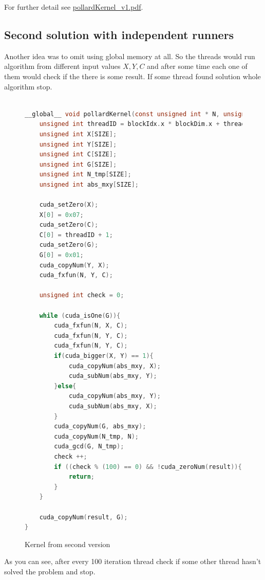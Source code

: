 \documentclass[a4paper]{article}
\begin{document}
For further detail see \url{pollardKernel_v1.pdf}.

\subsection{Second solution with independent runners}

Another idea was to omit using global memory at all. So the threads would run algorithm from different input values $X, Y, C$ and after some time each one of them would check if the there is some result. If some thread found solution whole algorithm stop.


\begin{figure}[H]
    \centering
    \begin{lstlisting}[language=c,basicstyle=\small]

__global__ void pollardKernel(const unsigned int * N, unsigned int * result){
    unsigned int threadID = blockIdx.x * blockDim.x + threadIdx.x;
    unsigned int X[SIZE];
    unsigned int Y[SIZE];
    unsigned int C[SIZE];
    unsigned int G[SIZE];
    unsigned int N_tmp[SIZE];
    unsigned int abs_mxy[SIZE];
    
    cuda_setZero(X);
    X[0] = 0x07;
    cuda_setZero(C);
    C[0] = threadID + 1;
    cuda_setZero(G);
    G[0] = 0x01;
    cuda_copyNum(Y, X);
    cuda_fxfun(N, Y, C);
   
    unsigned int check = 0;

    while (cuda_isOne(G)){
        cuda_fxfun(N, X, C);
        cuda_fxfun(N, Y, C);
        cuda_fxfun(N, Y, C);
        if(cuda_bigger(X, Y) == 1){
            cuda_copyNum(abs_mxy, X);
            cuda_subNum(abs_mxy, Y);
        }else{
            cuda_copyNum(abs_mxy, Y);
            cuda_subNum(abs_mxy, X);    
        }
        cuda_copyNum(G, abs_mxy);
        cuda_copyNum(N_tmp, N);
        cuda_gcd(G, N_tmp);
        check ++;
        if ((check % (100) == 0) && !cuda_zeroNum(result)){
            return;
        }
    }
    
    cuda_copyNum(result, G);    
}

    \end{lstlisting}
    \caption{Kernel from second version}
    \label{kernelv2}
\end{figure}

As you can see, after every 100 iteration thread check if some other thread hasn't solved the problem and stop. 
\end{document}
